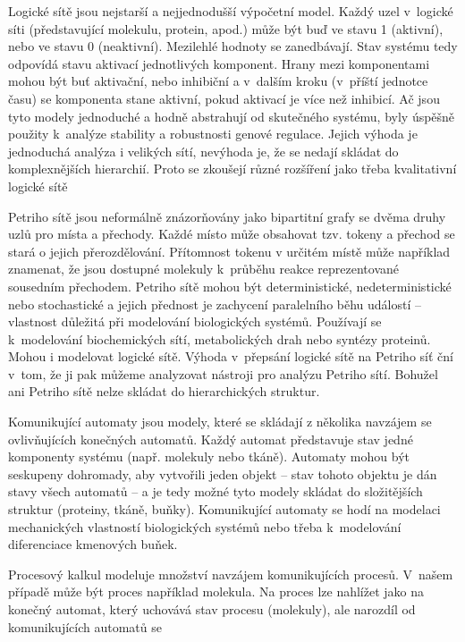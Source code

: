 \documentclass[a4paper]{article}
\begin{document}
\par
Logické sítě jsou nejstarší a nejjednodušší výpočetní
model. Každý uzel v~logické síti (představující molekulu, protein, apod.) může být
buď ve stavu 1 (aktivní), nebo ve stavu 0 (neaktivní). Mezilehlé hodnoty se zanedbávají.
Stav systému tedy odpovídá stavu aktivací jednotlivých komponent. Hrany mezi komponentami
mohou být buť aktivační, nebo inhibiční a v~dalším kroku (v~příští jednotce času)
se komponenta stane aktivní, pokud aktivací je více než inhibicí. Ač jsou tyto modely
jednoduché a hodně abstrahují od skutečného systému, byly úspěšně použity
k~analýze stability a robustnosti genové regulace\cite{Fisher}. Jejich výhoda je jednoduchá analýza
i velikých sítí, nevýhoda je, že se nedají skládat do komplexnějších hierarchií. Proto
se zkoušejí různé rozšíření jako třeba kvalitativní logické sítě\cite{Shaub}
\par
Petriho sítě jsou neformálně znázorňovány jako bipartitní grafy se dvěma druhy uzlů pro
místa a přechody. Každé místo může obsahovat tzv. tokeny a přechod se stará o jejich přerozdělování.
Přítomnost tokenu v určitém místě může například znamenat, že jsou dostupné molekuly k~průběhu reakce
reprezentované sousedním přechodem. Petriho sítě mohou být deterministické, nedeterministické
nebo stochastické a
jejich přednost je zachycení paralelního běhu událostí -- vlastnost důležitá při modelování
biologických systémů. Používají se k~modelování biochemických sítí, metabolických drah
nebo syntézy proteinů. Mohou i modelovat logické sítě. Výhoda v~přepsání logické sítě
na Petriho síť ční v~tom, že ji pak můžeme analyzovat nástroji pro analýzu Petriho sítí.
Bohužel ani Petriho sítě nelze skládat do hierarchických struktur.
\par
Komunikující automaty jsou modely, které se skládají z několika navzájem se ovlivňujících
konečných automatů. Každý automat představuje stav jedné komponenty systému (např. molekuly nebo tkáně).
Automaty mohou být seskupeny dohromady, aby vytvořili jeden objekt -- stav tohoto objektu
je dán stavy všech automatů -- a je tedy možné tyto modely skládat do složitějších struktur
(proteiny, tkáně, buňky). Komunikující automaty se hodí na modelaci mechanických vlastností
biologických systémů nebo třeba k~modelování diferenciace kmenových buňek\cite{Fisher}.
\par
Procesový kalkul modeluje množství navzájem komunikujících procesů.
V~našem případě může být proces například molekula. Na proces lze nahlížet jako na konečný automat,
který uchovává stav procesu (molekuly), ale narozdíl od komunikujících automatů se
\end{document}
